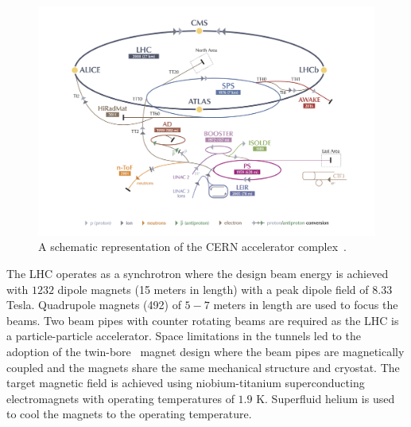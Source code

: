 \begin{figure}[h]
\centering
\includegraphics[width=1.0\columnwidth]{figures_chapter2/cern_complex.jpg}
\caption{A schematic representation of the CERN accelerator complex~\cite{Haffner:1621894}.}
\label{fig:cern}
\end{figure}

The LHC operates as a synchrotron where the design beam energy is achieved with $1232$ dipole magnets (15 meters in length) with a peak dipole field of $8.33$ Tesla. Quadrupole magnets (492) of $5-7$ meters in length are used to focus the beams. Two beam pipes with counter rotating beams are required as the LHC is a particle-particle accelerator.  Space limitations in the tunnels led to the adoption of the twin-bore~\cite{Blewett:1971zzb} magnet design where the beam pipes are magnetically coupled and the magnets share the same mechanical structure and cryostat. The target magnetic field is achieved using niobium-titanium superconducting electromagnets with operating temperatures of $1.9$ K. Superfluid helium is used to cool the magnets to the operating temperature.
   
